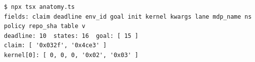 \begin{Verbatim}[fontsize=\small,frame=leftline,rulecolor=\color{accentmid},framesep=3mm,xleftmargin=3mm]
$ npx tsx anatomy.ts
fields: claim deadline env_id goal init kernel kwargs lane mdp_name ns policy repo_sha table v
deadline: 10  states: 16  goal: [ 15 ]
claim: [ '0x032f', '0x4ce3' ]
kernel[0]: [ 0, 0, 0, '0x02', '0x03' ]
\end{Verbatim}
